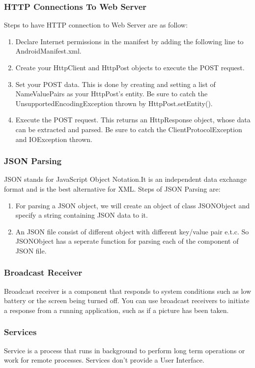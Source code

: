\subsubsection{HTTP Connections To Web Server}
Steps to have HTTP connection to Web Server are as follow:
\begin{enumerate}
\item Declare Internet permissions in the manifest by adding the following line to AndroidManifest.xml.
\item Create your HttpClient and HttpPost objects to execute the POST request. 
\item Set your POST data. This is done by creating and setting a list of NameValuePairs as your HttpPost's entity. Be sure to catch the UnsupportedEncodingException thrown by HttpPost.setEntity().
\item Execute the POST request. This returns an HttpResponse object, whose data can be extracted and parsed. Be sure to catch the ClientProtocolException and IOException thrown.
\end{enumerate}

\subsubsection{JSON Parsing}
JSON stands for JavaScript Object Notation.It is an independent data exchange format and is the best alternative for XML.
Steps of JSON Parsing are:
\begin{enumerate}
\item For parsing a JSON object, we will create an object of class JSONObject and specify a string containing JSON data to it. 
\item An JSON file consist of different object with different key/value pair e.t.c. So JSONObject has a seperate function for parsing each of the component of JSON file.
\end{enumerate}

\subsubsection{Broadcast Receiver}
Broadcast receiver is a component that responds to system conditions such as low battery or the screen being turned off. You can
use broadcast receivers to initiate a response from a running application, such as if a picture has been taken.
\subsubsection{Services}
Service is a process that runs in background to perform long term operations or work for remote processes. Services don't provide a User Interface.

